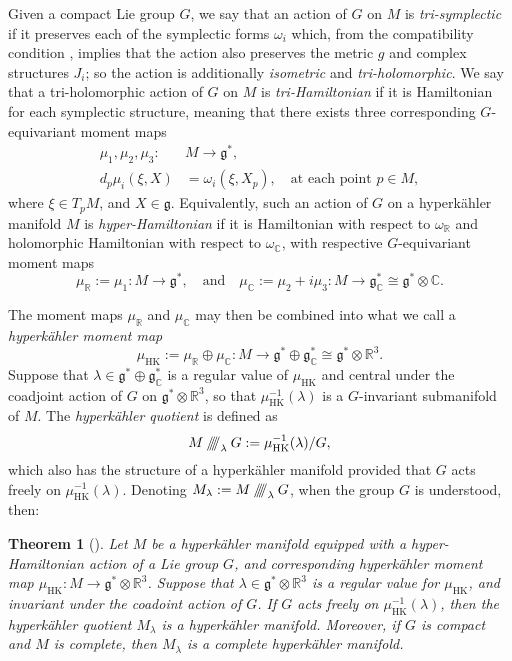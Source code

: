 \documentclass{amsart}
\newtheorem{theorem}{Theorem}[section]
\newcommand{\ra}{\rightarrow}
\newcommand{\w}{\omega}
\newcommand{\RR}{\mathbb{R}}
\newcommand{\CC}{\mathbb{C}}
\newcommand{\mfg}{\mathfrak{g}}
\newcommand{\sssslash}{\mathbin{/\mkern-6mu/\mkern-6mu/\mkern-6mu/}}
\DeclareMathOperator{\HK}{HK}
\begin{document}
	
	Given a compact Lie group $G$, we say that an action of $G$ on $M$ is \emph{tri-symplectic} if it preserves each of the symplectic forms $\w_{i}$ which, from the compatibility condition , implies that the action also preserves the metric $g$ and complex structures $J_{i}$; so the action is additionally \emph{isometric} and \emph{tri-holomorphic}. We say that a tri-holomorphic action of $G$ on $M$ is \emph{tri-Hamiltonian} if it is Hamiltonian for each symplectic structure, meaning that there exists three corresponding $G$-equivariant moment maps
	\begin{equation}
		\begin{split}
			\mu_{1}, \mu_{2},\mu_{3} : &M \ra \mfg^{\ast}, \\
			d_{p}\mu_{i}(\xi, X) &= \w_{i}(\xi, X_{p}),\quad \text{at each point } p \in M,
		\end{split}
	\end{equation}
	where $\xi \in T_{p}M$, and $X \in \mfg$. Equivalently, such an action of $G$ on a hyperk\"ahler manifold $M$ is \emph{hyper-Hamiltonian} if it is Hamiltonian with respect to $\w_{\RR}$ and holomorphic Hamiltonian with respect to $\w_{\CC}$, with respective $G$-equivariant moment maps 
	\[
		\mu_{\RR} := \mu_{1} : M \ra \mfg^{\ast}, \quad \text{and} \quad \mu_{\CC} := \mu_{2} + i\mu_{3} : M \ra \mfg_{\CC}^{\ast} \cong \mfg^{\ast} \otimes \CC.
	\]
	
	The moment maps $\mu_{\RR}$ and $\mu_{\CC}$ may then be combined into what we call a \emph{hyperk\"ahler moment map}
	\[
		\mu_{\HK} := \mu_{\RR} \oplus \mu_{\CC} : M \ra \mfg^{\ast} \oplus \mfg_{\CC}^{\ast} \cong \mfg^{\ast} \otimes \RR^{3}.
	\]
	Suppose that $\lambda \in \mfg^{\ast} \oplus \mfg_{\CC}^{\ast}$ is a regular value of $\mu_{\HK}$ and central under the coadjoint action of $G$ on $\mfg^{\ast} \otimes \RR^{3}$, so that $\mu_{\HK}^{-1}(\lambda)$ is a $G$-invariant submanifold of $M$. The \emph{hyperk\"ahler quotient} is defined as
	\[
		M \sssslash_{\lambda}G := \mu_{\HK}^{-1}(\lambda)/G,
	\]
	which also has the structure of a hyperk\"ahler manifold provided that $G$ acts freely on $\mu_{\HK}^{-1}(\lambda)$. Denoting $M_{\lambda} := M \sssslash_{\lambda} G$, when the group $G$ is understood, then: 
	
	\begin{theorem}[\cite{HKLR87}]
		Let $M$ be a hyperk\"ahler manifold equipped with a hyper-Hamiltonian action of a Lie group $G$, and corresponding hyperk\"ahler moment map $\mu_{\HK} : M \ra \mfg^{\ast} \otimes \RR^{3}$. Suppose that $\lambda \in \mfg^{\ast} \otimes \RR^{3}$ is a regular value for $\mu_{\HK}$, and invariant under the coadoint action of $G$. If $G$ acts freely on $\mu_{\HK}^{-1}(\lambda)$, then the hyperk\"ahler quotient $M_{\lambda}$ is a hyperk\"ahler manifold. Moreover, if $G$ is compact and $M$ is complete, then $M_{\lambda}$ is a complete hyperk\"ahler manifold.
	\end{theorem}
\end{document}
